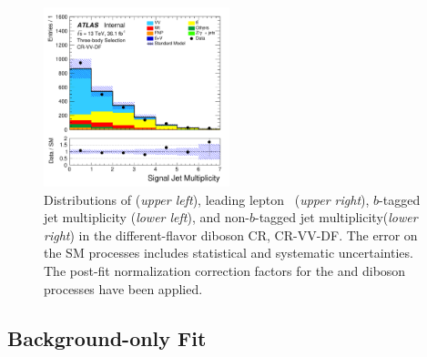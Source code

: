 \begin{figure}[!htb]
\begin{center}
        \includegraphics[width=0.48\textwidth]{figures/search_stop2l/bkg_est/crvdf/crv_nSJets}
        \caption{
            Distributions of \rpt (\textit{upper left}), leading lepton \gaminv~(\textit{upper right}),
            $b$-tagged jet multiplicity (\textit{lower left}), and non-$b$-tagged jet multiplicity(\textit{lower right}) in the different-flavor diboson CR,
            CR-VV-DF.
            The error on the SM processes includes statistical and systematic uncertainties.
            The post-fit normalization correction factors for the \ttbar and diboson processes
            have been applied.
        }
        \label{fig:crvvDF_1}
    \end{center}
\end{figure}

\FloatBarrier
%
%

\subsection{Background-only Fit}
\label{sec:stop_background_only}

